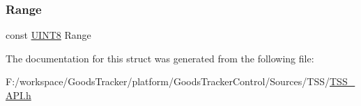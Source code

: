 \mbox{\label{struct_t_s_s___c_s_a_slider_ac3bbfb6603540e32d0c07254344b524c}} 
\subsubsection{\texorpdfstring{Range}{Range}}
{\footnotesize\ttfamily const \hyperlink{_t_s_s___data_types_8h_ab27e9918b538ce9d8ca692479b375b6a}{U\+I\+N\+T8} Range}



The documentation for this struct was generated from the following file\+:\begin{DoxyCompactItemize}
\item 
F\+:/workspace/\+Goods\+Tracker/platform/\+Goods\+Tracker\+Control/\+Sources/\+T\+S\+S/\hyperlink{_t_s_s___a_p_i_8h}{T\+S\+S\+\_\+\+A\+P\+I.\+h}\end{DoxyCompactItemize}

